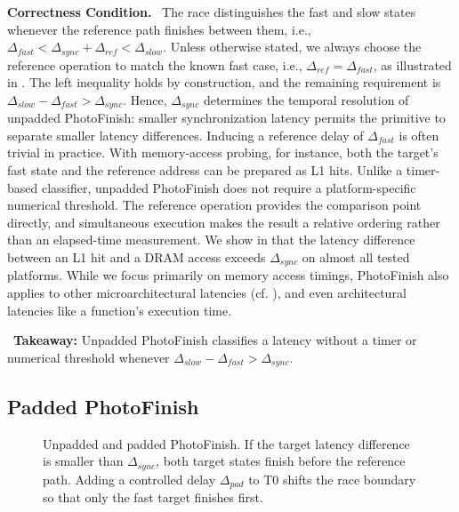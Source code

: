 \documentclass[letterpaper,twocolumn,10pt]{article} %
\newcommand{\paragrabf}[1]{\noindent \textbf{#1.}\ }
\newcommand{\AttackName}{PhotoFinish\xspace}
\newcommand{\tprobe}{{\fontfamily{cmtt}\selectfont T0}\xspace}
\newcommand{\takeaway}[1]{%
\begin{tcolorbox}[boxsep=1pt,left=2pt,right=2pt,top=1pt,bottom=1pt]
    \faLightbulb[regular]~\textbf{Takeaway:} #1
\end{tcolorbox}
}
\begin{document}
\paragrabf{Correctness Condition}
The race distinguishes the fast and slow states whenever the reference path finishes between them, i.e., $\Delta_{fast} < \Delta_{sync} + \Delta_{ref} < \Delta_{slow}$.
Unless otherwise stated, we always choose the reference operation to match the known fast case, i.e., $\Delta_{ref}=\Delta_{fast}$, as illustrated in .
The left inequality holds by construction, and the remaining requirement is $\Delta_{slow} - \Delta_{fast} > \Delta_{sync}$.
Hence, $\Delta_{sync}$ determines the temporal resolution of unpadded \AttackName: smaller synchronization latency permits the primitive to separate smaller latency differences.
Inducing a reference delay of $\Delta_{fast}$ is often trivial in practice.
With memory-access probing, for instance, both the target's fast state and the reference address can be prepared as L1 hits.
Unlike a timer-based classifier, unpadded \AttackName does not require a platform-specific numerical threshold.
The reference operation provides the comparison point directly, and simultaneous execution makes the result a relative ordering rather than an elapsed-time measurement.
We show in  that the latency difference between an L1 hit and a DRAM access exceeds $\Delta_{sync}$ on almost all tested platforms.
While we focus primarily on memory access timings, \AttackName also applies to other microarchitectural latencies (cf. ), and even architectural latencies like a function's execution time.

\takeaway{Unpadded \AttackName classifies a latency without a timer or numerical threshold whenever $\Delta_{slow}-\Delta_{fast}>\Delta_{sync}$.}



\subsection{Padded \AttackName}\label{subsec:padded-probing}

\begin{figure}[t]
  
  \centering
  
  \caption{Unpadded and padded \AttackName. If the target latency difference is smaller than $\Delta_{sync}$, both target states finish before the reference path. Adding a controlled delay $\Delta_{pad}$ to \tprobe shifts the race boundary so that only the fast target finishes first.}
  \label{fig:primitive_padded}
\end{figure}
\end{document}
